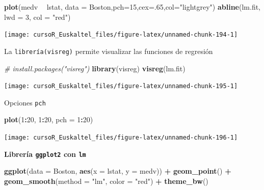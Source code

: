 \documentclass[]{book}
\newenvironment{Shaded}{\begin{snugshade}}{\end{snugshade}}
\newcommand{\KeywordTok}[1]{\textcolor[rgb]{0.13,0.29,0.53}{\textbf{#1}}}
\newcommand{\DataTypeTok}[1]{\textcolor[rgb]{0.13,0.29,0.53}{#1}}
\newcommand{\DecValTok}[1]{\textcolor[rgb]{0.00,0.00,0.81}{#1}}
\newcommand{\StringTok}[1]{\textcolor[rgb]{0.31,0.60,0.02}{#1}}
\newcommand{\CommentTok}[1]{\textcolor[rgb]{0.56,0.35,0.01}{\textit{#1}}}
\newcommand{\OperatorTok}[1]{\textcolor[rgb]{0.81,0.36,0.00}{\textbf{#1}}}
\newcommand{\NormalTok}[1]{#1}
\begin{document}
\begin{Shaded}
\begin{Highlighting}[]
\KeywordTok{plot}\NormalTok{(medv }\OperatorTok{~}\StringTok{ }\NormalTok{lstat, }\DataTypeTok{data =}\NormalTok{ Boston,}\DataTypeTok{pch=}\DecValTok{15}\NormalTok{,}\DataTypeTok{cex=}\NormalTok{.}\DecValTok{65}\NormalTok{,}\DataTypeTok{col=}\StringTok{"lightgrey"}\NormalTok{)}
\KeywordTok{abline}\NormalTok{(lm.fit, }\DataTypeTok{lwd =} \DecValTok{3}\NormalTok{, }\DataTypeTok{col =} \StringTok{"red"}\NormalTok{)}
\end{Highlighting}
\end{Shaded}

\begin{center}\texttt{[image: cursoR\_Euskaltel\_files/figure-latex/unnamed-chunk-194-1]} \end{center}

La \texttt{librería(visreg)} permite visualizar las funciones de
regresión

\begin{Shaded}
\begin{Highlighting}[]
\CommentTok{# install.packages("visreg")}
\KeywordTok{library}\NormalTok{(visreg)}
\KeywordTok{visreg}\NormalTok{(lm.fit)}
\end{Highlighting}
\end{Shaded}

\begin{center}\texttt{[image: cursoR\_Euskaltel\_files/figure-latex/unnamed-chunk-195-1]} \end{center}

Opciones \texttt{pch}

\begin{Shaded}
\begin{Highlighting}[]
\KeywordTok{plot}\NormalTok{(}\DecValTok{1}\OperatorTok{:}\DecValTok{20}\NormalTok{, }\DecValTok{1}\OperatorTok{:}\DecValTok{20}\NormalTok{, }\DataTypeTok{pch =} \DecValTok{1}\OperatorTok{:}\DecValTok{20}\NormalTok{)}
\end{Highlighting}
\end{Shaded}

\begin{center}\texttt{[image: cursoR\_Euskaltel\_files/figure-latex/unnamed-chunk-196-1]} \end{center}

\textbf{Librería \texttt{ggplot2} con \texttt{lm}}

\begin{Shaded}
\begin{Highlighting}[]
\KeywordTok{ggplot}\NormalTok{(}\DataTypeTok{data =}\NormalTok{ Boston, }\KeywordTok{aes}\NormalTok{(}\DataTypeTok{x =}\NormalTok{ lstat, }\DataTypeTok{y =}\NormalTok{ medv)) }\OperatorTok{+}
\StringTok{  }\KeywordTok{geom_point}\NormalTok{() }\OperatorTok{+}
\StringTok{  }\KeywordTok{geom_smooth}\NormalTok{(}\DataTypeTok{method =} \StringTok{"lm"}\NormalTok{, }\DataTypeTok{color =} \StringTok{"red"}\NormalTok{) }\OperatorTok{+}
\StringTok{  }\KeywordTok{theme_bw}\NormalTok{()}
\end{Highlighting}
\end{Shaded}
\end{document}
